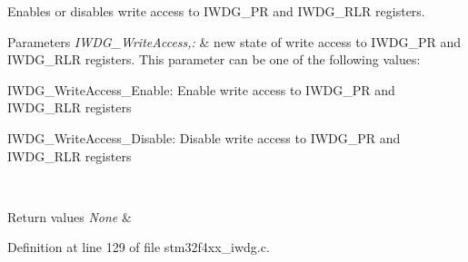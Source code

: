 Enables or disables write access to I\-W\-D\-G\-\_\-\-P\-R and I\-W\-D\-G\-\_\-\-R\-L\-R registers. 


\begin{DoxyParams}{Parameters}
{\em I\-W\-D\-G\-\_\-\-Write\-Access,\-:} & new state of write access to I\-W\-D\-G\-\_\-\-P\-R and I\-W\-D\-G\-\_\-\-R\-L\-R registers. This parameter can be one of the following values\-: \begin{DoxyItemize}
\item I\-W\-D\-G\-\_\-\-Write\-Access\-\_\-\-Enable\-: Enable write access to I\-W\-D\-G\-\_\-\-P\-R and I\-W\-D\-G\-\_\-\-R\-L\-R registers \item I\-W\-D\-G\-\_\-\-Write\-Access\-\_\-\-Disable\-: Disable write access to I\-W\-D\-G\-\_\-\-P\-R and I\-W\-D\-G\-\_\-\-R\-L\-R registers \end{DoxyItemize}
\\
\hline
\end{DoxyParams}

\begin{DoxyRetVals}{Return values}
{\em None} & \\
\hline
\end{DoxyRetVals}


Definition at line 129 of file stm32f4xx\-\_\-iwdg.\-c.

